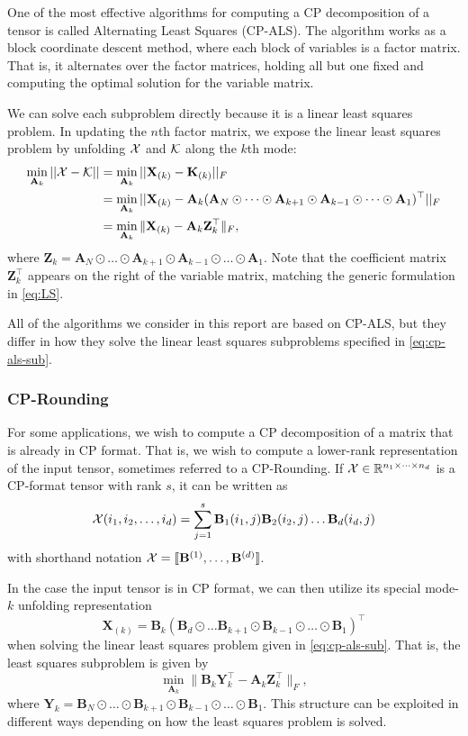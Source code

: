 \documentclass{article}
\newcommand{\mat}[1]{\mathbf{#1}}
\newcommand{\T}[2][]{#1{\mathbf{\cal{#2}}}} 						%
\begin{document}
One of the most effective algorithms for computing a CP decomposition of a tensor is called Alternating Least Squares (CP-ALS).
The algorithm works as a block coordinate descent method, where each block of variables is a factor matrix.
That is, it alternates over the factor matrices, holding all but one fixed and computing the optimal solution for the variable matrix.

We can solve each subproblem directly because it is a linear least squares problem.
In updating the $n$th factor matrix, we expose the linear least squares problem by unfolding $\T{X}$ and $\T{K}$ along the $k$th mode:
\begin{align}
\label{eq:cp-als-sub}
\min_{\mat{A}_k}||\T{X} - \T{K}|| &= \min_{\mat{A}_k}||\mat{X}_{(k)} - \mat{K}_{(k)}||_F \notag \\ 
&=  \min_{\mat{A}_k}||\mat{X}_{(k)} - \mat{A}_k(\mat{A}_N \odot \dots \odot \mat{A}_{k+1} \odot \mat{A}_{k-1} \odot \dots \odot \mat{A}_1)^\top||_F \notag \\ 
&=  \min_{\mat{A}_k}\|\mat{X}_{(k)}-\mat{A}_k\mat{Z}_k^\top\|_F,
\end{align}
where $\mat{Z}_k=\mat{A}_N \odot \dots \odot \mat{A}_{k+1} \odot \mat{A}_{k-1} \odot \dots \odot \mat{A}_1$.
Note that the coefficient matrix $\mat{Z}_k^\top$ appears on the right of the variable matrix, matching the generic formulation in \cref{eq:LS}.

All of the algorithms we consider in this report are based on CP-ALS, but they differ in how they solve the linear least squares subproblems specified in \cref{eq:cp-als-sub}.

\subsubsection{CP-Rounding}
\label{sec:cp-rounding}

For some applications, we wish to compute a CP decomposition of a matrix that is already in CP format.
That is, we wish to compute a lower-rank representation of the input tensor, sometimes referred to a CP-Rounding.
If $\T{X} \in \mathbb{R}^{n_1 \times \dots \times n_d}$ is a CP-format tensor with rank $s$, it can be written as 
$$\T{X}(i_1,i_2,\dots, i_d) = \sum^{s}_{j=1} \mat{B}_1(i_1,j)\mat{B}_2(i_2,j) \dots \mat{B}_d(i_d,j)$$
with shorthand notation $\T{X} = [\![\mat{B}^{(1)}, \dots ,\mat{B}^{(d)}]\!]$.

In the case the input tensor is in CP format, we can then utilize its special mode-$k$ unfolding representation 
$$\mat{X}_{(k)} = \mat{B}_k(\mat{B}_d \odot \dots \mat{B}_{k+1} \odot \mat{B}_{k-1} \odot \dots \odot \mat{B}_1)^\top$$
when solving the linear least squares problem given in \cref{eq:cp-als-sub}. 
That is, the least squares subproblem is given by 
\begin{equation}
\label{eq:cp-als-sub-ktensor}
\min_{\mat{A}_k}\|\mat{B}_{k}\mat{Y}_k^\top-\mat{A}_k\mat{Z}_k^\top\|_F,
\end{equation}
where $\mat{Y}_k = \mat{B}_N \odot \dots \odot \mat{B}_{k+1} \odot \mat{B}_{k-1} \odot \dots \odot \mat{B}_1$.
This structure can be exploited in different ways depending on how the least squares problem is solved.
\end{document}
